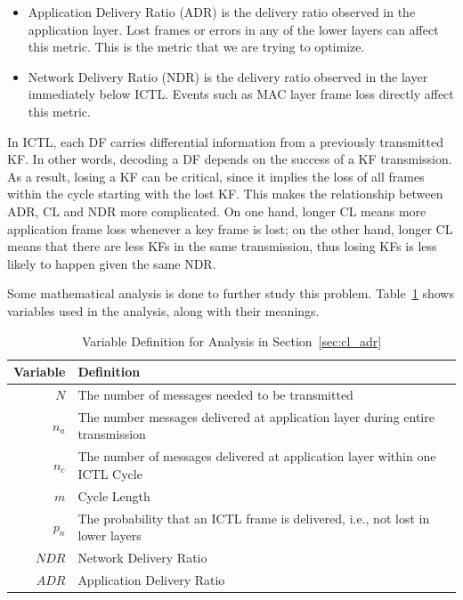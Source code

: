 \documentclass[12pt]{report}
\begin{document}
\begin{itemize}
  \item Application Delivery Ratio (ADR) is the delivery ratio observed in the application layer. Lost frames or errors in any of the lower layers can affect this metric. This is the metric that we are trying to optimize.
  \item Network Delivery Ratio (NDR) is the delivery ratio observed in the layer immediately below ICTL. Events such as MAC layer frame loss directly affect this metric.
\end{itemize}

In ICTL, each DF carries differential information from a previously transmitted KF. In other words, decoding a DF depends on the success of a KF transmission. As a result, losing a KF can be critical, since it implies the loss of all frames within the cycle starting with the lost KF. This makes the relationship between ADR, CL and NDR more complicated. On one hand, longer CL means more application frame loss whenever a key frame is lost; on the other hand, longer CL means that there are less KFs in the same transmission, thus losing KFs is less likely to happen given the same NDR.

Some mathematical analysis is done to further study this problem. Table~\ref{tab:cl_var} shows variables used in the analysis, along with their meanings.

\begin{table}
  \begin{center}
    \begin{tabular}{r l}
      \hline
      Variable & Definition \\ \hline
      $N$      & The number of messages needed to be transmitted \\
      $n_a$    & The number messages delivered at application layer during entire transmission \\
      $n_c$ & The number of messages delivered at application layer within one ICTL Cycle \\ 
      $m$      & Cycle Length \\
      $p_n$    & The probability that an ICTL frame is delivered, i.e., not lost in lower layers \\
      $NDR$    & Network Delivery Ratio \\
      $ADR$    & Application Delivery Ratio \\
      \hline
    \end{tabular}
    \caption{\label{tab:cl_var}Variable Definition for Analysis in Section~\ref{sec:cl_adr}}
  \end{center}
\end{table}
\end{document}
